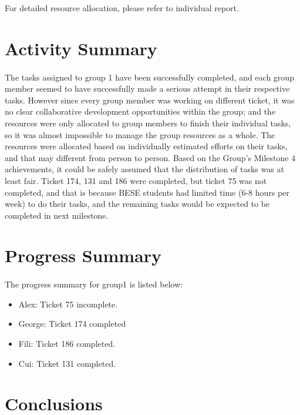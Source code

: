 \documentclass[10pt,a4,oneside]{article}
\begin{document}
For detailed resource allocation, please refer to individual report.
\section{Activity Summary}

\paragraph{}
The tasks assigned to group 1 have been successfully completed, and each group member seemed to have successfully made a serious attempt in their respective tasks. However since every group member was working on different ticket, it was no clear collaborative development opportunities within the group; and the resources were only allocated to group members to finish their individual tasks, so it was almost impossible to manage the group resources as a whole. The resources were allocated based on individually estimated efforts on their tasks, and that may different from person to person. Based on the Group's Milestone 4 achievements, it could be safely assumed that the distribution of tasks was at least fair. Ticket 174, 131 and 186 were completed, but ticket 75 was not completed, and that is because BESE students had limited time (6-8 hours per week) to do their tasks, and the remaining tasks would be expected to be completed in next milestone. 

\section{Progress Summary}

\paragraph{}
The progress summary for group1 is listed below:

\begin{itemize}
 \item Alex: Ticket 75 incomplete.
 \item George: Ticket 174 completed
 \item Fili: Ticket 186 completed.
 \item Cui: Ticket 131 completed.
\end{itemize}

\newpage

\section{Conclusions}
\end{document}
